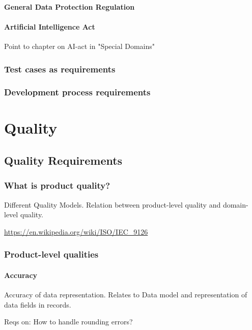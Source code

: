 \documentclass{reqengbook}
\begin{document}
\subsection{General Data Protection Regulation} 

\subsection{Artificial Intelligence Act}
Point to chapter on AI-act in "Special Domains"

\section{Test cases as requirements}

\section{Development process requirements}


\part{Quality} %


\chapter{Quality Requirements}
\section{What is product quality?}
Different Quality Models. Relation between product-level quality and domain-level quality.

\url{https://en.wikipedia.org/wiki/ISO/IEC_9126}

\section{Product-level qualities}
\subsection{Accuracy}

Accuracy of data representation. Relates to Data model and  representation of data fields in records.

Reqs on: How to handle rounding errors?
\end{document}
